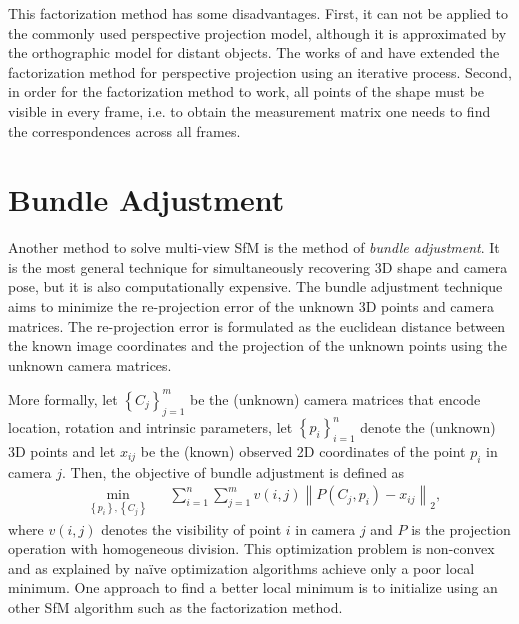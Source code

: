 		This factorization method has some disadvantages.
		First, it can not be applied to the commonly used perspective projection model, although it is approximated by the orthographic model for distant objects.
		The works of \cite{sturm1996factorization} and \cite{christy1996euclidean} have extended the factorization method for perspective projection using an iterative process.
		Second, in order for the factorization method to work, all points of the shape must be visible in every frame, i.e. to obtain the measurement matrix one needs to find the correspondences across all frames.
		
	\section{Bundle Adjustment} 
		Another method to solve multi-view SfM is the method of \emph{bundle adjustment}.
		It is the most general technique for simultaneously recovering 3D shape and camera pose, but it is also computationally expensive.
		The bundle adjustment technique aims to minimize the re-projection error of the unknown 3D points and camera matrices.
		The re-projection error is formulated as the euclidean distance between the known image coordinates and the projection of the unknown points using the unknown camera matrices.
		
		More formally, let 
			$\left \lbrace C_j \right \rbrace_{j = 1}^{m}$ 
		be the (unknown) camera matrices that encode location, rotation and intrinsic parameters, let 
			$\left \lbrace p_i \right \rbrace_{i = 1}^{n}$ 
		denote the (unknown) 3D points and let $x_{ij}$ be the (known) observed 2D coordinates of the point $p_i$ in camera $j$.
		Then, the objective of bundle adjustment is defined as
		\begin{equation}\label{eq:bundle_adjustment}
			\begin{aligned}
				& \underset{\left\lbrace p_i \right\rbrace, \left\lbrace C_j \right\rbrace}{\text{min}}
				& & \sum_{i = 1}^{n} \sum_{j = 1}^{m} v(i, j) \left\| P(C_j, p_i) - x_{ij} \right\|_2 ,
			\end{aligned}
		\end{equation}
		where $v(i, j)$ denotes the visibility of point $i$ in camera $j$ and $P$ is the projection operation with homogeneous division.
		This optimization problem is non-convex and as explained by \cite{survey2017} na\"ive optimization algorithms achieve only a poor local minimum.
		One approach to find a better local minimum is to initialize using an other SfM algorithm such as the factorization method.
		
